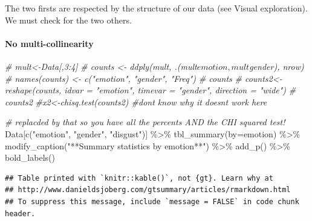 \documentclass[
]{article}
\newenvironment{Shaded}{\begin{snugshade}}{\end{snugshade}}
\newcommand{\AttributeTok}[1]{\textcolor[rgb]{0.77,0.63,0.00}{#1}}
\newcommand{\CommentTok}[1]{\textcolor[rgb]{0.56,0.35,0.01}{\textit{#1}}}
\newcommand{\FunctionTok}[1]{\textcolor[rgb]{0.00,0.00,0.00}{#1}}
\newcommand{\NormalTok}[1]{#1}
\newcommand{\SpecialCharTok}[1]{\textcolor[rgb]{0.00,0.00,0.00}{#1}}
\newcommand{\StringTok}[1]{\textcolor[rgb]{0.31,0.60,0.02}{#1}}
\begin{document}
The two firsts are respected by the structure of our data (see Visual
exploration). We must check for the two others.

\hypertarget{no-multi-collinearity}{%
\paragraph{No multi-collinearity}\label{no-multi-collinearity}}

\begin{Shaded}
\begin{Highlighting}[]
\CommentTok{\# mult\textless{}{-}Data[,3:4]}
\CommentTok{\# counts \textless{}{-} ddply(mult, .(mult$emotion, mult$gender), nrow)}
\CommentTok{\# names(counts) \textless{}{-} c("emotion", "gender", "Freq")}
\CommentTok{\# counts}
\CommentTok{\# counts2\textless{}{-}reshape(counts, idvar = "emotion", timevar = "gender", direction = "wide")}
\CommentTok{\# counts2}
\CommentTok{\#x2\textless{}{-}chisq.test(counts2) \#don\textquotesingle{}t know why it doesn\textquotesingle{}t work here}


 \CommentTok{\# replacded by that so you have all the percents AND the CHI squared test!}
\NormalTok{Data[}\FunctionTok{c}\NormalTok{(}\StringTok{"emotion"}\NormalTok{, }\StringTok{"gender"}\NormalTok{, }\StringTok{"disgust"}\NormalTok{)] }\SpecialCharTok{\%\textgreater{}\%}  \FunctionTok{tbl\_summary}\NormalTok{(}\AttributeTok{by=}\NormalTok{emotion)  }\SpecialCharTok{\%\textgreater{}\%} \FunctionTok{modify\_caption}\NormalTok{(}\StringTok{"**Summary statistics by emotion**"}\NormalTok{) }\SpecialCharTok{\%\textgreater{}\%}
  \FunctionTok{add\_p}\NormalTok{() }\SpecialCharTok{\%\textgreater{}\%} \FunctionTok{bold\_labels}\NormalTok{()}
\end{Highlighting}
\end{Shaded}

\begin{verbatim}
## Table printed with `knitr::kable()`, not {gt}. Learn why at
## http://www.danieldsjoberg.com/gtsummary/articles/rmarkdown.html
## To suppress this message, include `message = FALSE` in code chunk header.
\end{verbatim}
\end{document}
